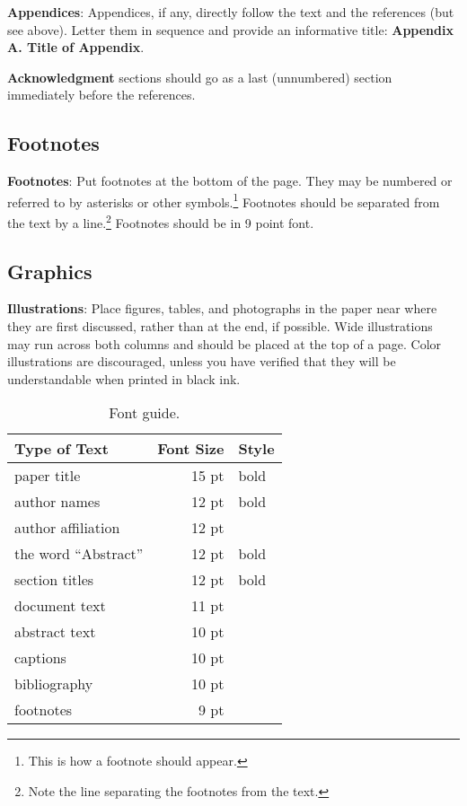 \documentclass[11pt,letterpaper]{article}
\begin{document}
{\bf Appendices}: Appendices, if any, directly follow the text and the
references (but see above).  Letter them in sequence and provide an
informative title: {\bf Appendix A. Title of Appendix}.

\textbf{Acknowledgment} sections should go as a last (unnumbered) section immediately
before the references.  

\subsection{Footnotes}

{\bf Footnotes}: Put footnotes at the bottom of the page. They may
be numbered or referred to by asterisks or other
symbols.\footnote{This is how a footnote should appear.} Footnotes
should be separated from the text by a line.\footnote{Note the
line separating the footnotes from the text.}  Footnotes should be in 9 point font.

\subsection{Graphics}

{\bf Illustrations}: Place figures, tables, and photographs in the
paper near where they are first discussed, rather than at the end, if
possible.  Wide illustrations may run across both columns and should be placed at
the top of a page. Color illustrations are discouraged, unless you have verified that 
they will be understandable when printed in black ink.

\begin{table}
\begin{center}
\begin{tabular}{|l|rl|}
\hline \bf Type of Text & \bf Font Size & \bf Style \\ \hline
paper title & 15 pt & bold \\
author names & 12 pt & bold \\
author affiliation & 12 pt & \\
the word ``Abstract'' & 12 pt & bold \\
section titles & 12 pt & bold \\
document text & 11 pt  &\\
abstract text & 10 pt & \\
captions & 10 pt & \\
bibliography & 10 pt & \\
footnotes & 9 pt & \\
\hline
\end{tabular}
\end{center}
\caption{\label{font-table} Font guide. }
\end{table}
\end{document}
